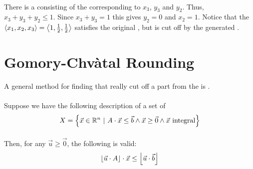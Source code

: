 \begin{example}

\paragraph{}
There is a  consisting of the  corresponding to $x_3$, $y_3$ and $y_2$. Thus, $x_3+y_3+y_2\leq 1$. Since $x_3+y_3=1$ this gives $y_2=0$ and $x_2=1$. Notice that the  $\left\langle x_1,x_2,x_3 \right\rangle=\left\langle 1,\frac{1}{2},\frac{1}{2} \right\rangle$ satisfies the original , but is cut off by the generated .
\end{example}

\section{Gomory-Chv\`atal Rounding}
A general method for finding  that really cut off a part from the  is .

\paragraph{}
Suppose we have the following description of a set of 
\begin{equation}
X=\left\{ \vec{x}\in\mathbb{R}^n\ |\ A\cdot\vec{x}\leq\vec{b}\wedge\vec{x}\geq\vec{0}\wedge\vec{x}\mbox{ integral} \right\}
\end{equation}

\paragraph{}
Then, for any  $\vec{u}\geq\vec{0}$, the following  is valid:
\begin{equation}
\left\lfloor \vec{u}\cdot A \right\rfloor\cdot\vec{x}\leq\left\lfloor \vec{u}\cdot\vec{b} \right\rfloor
\end{equation}

